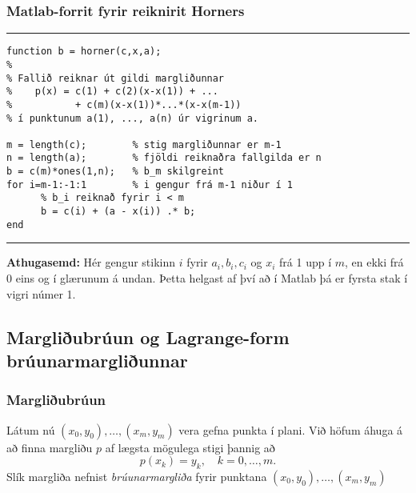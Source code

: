 \documentclass[icelandic,a4paper,12pt]{article}
\begin{document}
\subsubsection{Matlab-forrit fyrir reiknirit Horners} 
\hrule
\begin{verbatim}
function b = horner(c,x,a); 
%  
% Fallið reiknar út gildi margliðunnar 
%    p(x) = c(1) + c(2)(x-x(1)) + ... 
%           + c(m)(x-x(1))*...*(x-x(m-1)) 
% í punktunum a(1), ..., a(n) úr vigrinum a. 

m = length(c);        % stig margliðunnar er m-1  
n = length(a);        % fjöldi reiknaðra fallgilda er n
b = c(m)*ones(1,n);   % b_m skilgreint
for i=m-1:-1:1        % i gengur frá m-1 niður í 1
      % b_i reiknað fyrir i < m
      b = c(i) + (a - x(i)) .* b; 
end 
\end{verbatim}
\hrule

\pause
\textbf{Athugasemd:} Hér gengur stikinn $i$ fyrir $a_i, b_i, c_i$ og $x_i$ frá 1 upp í $m$, en
ekki frá 0 eins og í glærunum á undan. Þetta helgast af því að í Matlab þá er fyrsta stak í vigri 
númer 1. 


%  
% 

\subsection{Margliðubrúun og Lagrange-form brúunarmargliðunnar}
\subsubsection{Margliðubrúun} 
Látum nú $(x_0,y_0), \ldots, (x_m,y_m)$ vera gefna punkta í plani. 
Við höfum áhuga á að finna margliðu $p$ af lægsta mögulega stigi þannig að
\begin{equation*}
  p(x_k) = y_k, \quad k = 0, \ldots, m.
\end{equation*}\pause
Slík margliða nefnist {\em brúunarmargliða} fyrir punktana
$(x_0,y_0), \ldots, (x_m,y_m)$  
\end{document}
